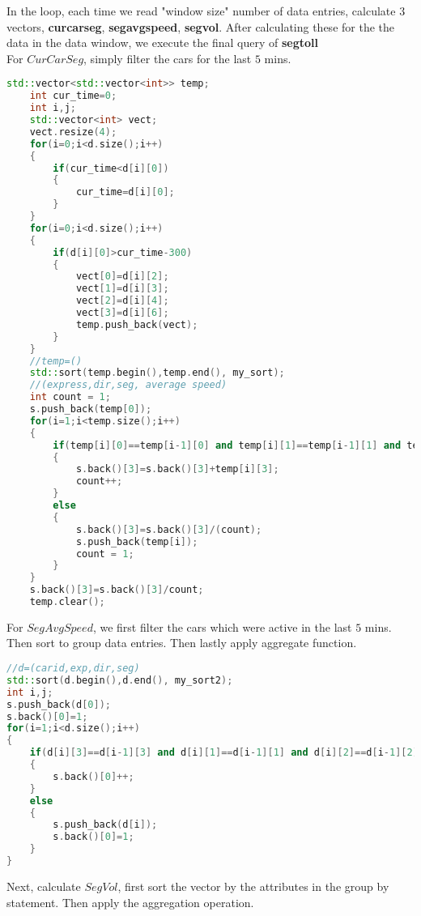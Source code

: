 In the loop, each time we read "window size" number of data entries, calculate $3$ vectors, \textbf{curcarseg}, \textbf{segavgspeed}, \textbf{segvol}. After calculating these for the the data in the data window, we execute the final query of \textbf{segtoll}\\
For $CurCarSeg$, simply filter the cars for the last $5$ mins.
\begin{lstlisting}[language=C++]
    std::vector<std::vector<int>> temp;
    int cur_time=0;
    int i,j;
    std::vector<int> vect;
    vect.resize(4);
    for(i=0;i<d.size();i++)
    {
        if(cur_time<d[i][0])
        {
            cur_time=d[i][0];
        }
    }
    for(i=0;i<d.size();i++)
    {
        if(d[i][0]>cur_time-300)
        {
            vect[0]=d[i][2];
            vect[1]=d[i][3];
            vect[2]=d[i][4];
            vect[3]=d[i][6];
            temp.push_back(vect);
        }
    }
    //temp=()
    std::sort(temp.begin(),temp.end(), my_sort);
    //(express,dir,seg, average speed)
    int count = 1;
    s.push_back(temp[0]);
    for(i=1;i<temp.size();i++)
    {
        if(temp[i][0]==temp[i-1][0] and temp[i][1]==temp[i-1][1] and temp[i][2]==temp[i-1][2])
        {
            s.back()[3]=s.back()[3]+temp[i][3];
            count++;
        }
        else
        {
            s.back()[3]=s.back()[3]/(count);
            s.push_back(temp[i]);
            count = 1;
        }
    }
    s.back()[3]=s.back()[3]/count;
    temp.clear();
\end{lstlisting}
For $SegAvgSpeed$, we first filter the cars which were active in the last $5$ mins.\\
Then sort to group data entries. Then lastly apply aggregate function.\\ 
\begin{lstlisting}[language=C++]
//d=(carid,exp,dir,seg)
std::sort(d.begin(),d.end(), my_sort2);
int i,j;
s.push_back(d[0]);
s.back()[0]=1;
for(i=1;i<d.size();i++)
{
    if(d[i][3]==d[i-1][3] and d[i][1]==d[i-1][1] and d[i][2]==d[i-1][2])
    {
        s.back()[0]++;
    }
    else
    {
        s.push_back(d[i]);
        s.back()[0]=1;
    }
}
\end{lstlisting}
Next, calculate $SegVol$, first sort the vector by the attributes in the group by statement. Then apply the aggregation operation.

